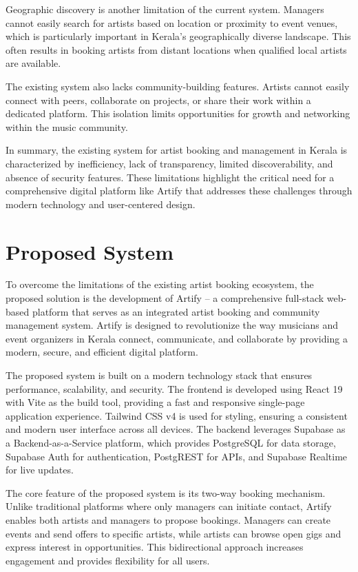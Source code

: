 \documentclass[12pt,a4paper]{report}
\begin{document}
Geographic discovery is another limitation of the current system. Managers cannot easily search for artists based on location or proximity to event venues, which is particularly important in Kerala's geographically diverse landscape. This often results in booking artists from distant locations when qualified local artists are available.

The existing system also lacks community-building features. Artists cannot easily connect with peers, collaborate on projects, or share their work within a dedicated platform. This isolation limits opportunities for growth and networking within the music community.

In summary, the existing system for artist booking and management in Kerala is characterized by inefficiency, lack of transparency, limited discoverability, and absence of security features. These limitations highlight the critical need for a comprehensive digital platform like Artify that addresses these challenges through modern technology and user-centered design.

\section{Proposed System}
To overcome the limitations of the existing artist booking ecosystem, the proposed solution is the development of Artify -- a comprehensive full-stack web-based platform that serves as an integrated artist booking and community management system. Artify is designed to revolutionize the way musicians and event organizers in Kerala connect, communicate, and collaborate by providing a modern, secure, and efficient digital platform.

The proposed system is built on a modern technology stack that ensures performance, scalability, and security. The frontend is developed using React 19 with Vite as the build tool, providing a fast and responsive single-page application experience. Tailwind CSS v4 is used for styling, ensuring a consistent and modern user interface across all devices. The backend leverages Supabase as a Backend-as-a-Service platform, which provides PostgreSQL for data storage, Supabase Auth for authentication, PostgREST for APIs, and Supabase Realtime for live updates.

The core feature of the proposed system is its two-way booking mechanism. Unlike traditional platforms where only managers can initiate contact, Artify enables both artists and managers to propose bookings. Managers can create events and send offers to specific artists, while artists can browse open gigs and express interest in opportunities. This bidirectional approach increases engagement and provides flexibility for all users.
\end{document}
